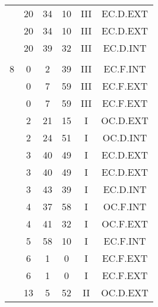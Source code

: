 \documentclass[12pt, a4paper]{article}
\begin{document}
\begin{multicols}{3}
{\begin{tabular}{c c c c c c}
	 	 	 	 & 20 & 34 & 10 & III & EC.D.EXT\\%
	 	 	 	 & 20 & 34 & 10 & III & EC.D.EXT\\%
	 	 	 	 & 20 & 39 & 32 & III & EC.D.INT\\%
	 	 	 	 & & & & & \\%
	 	 	 	8 & 0 & 2 & 39 & III & EC.F.INT\\%
	 	 	 	 & 0 & 7 & 59 & III & EC.F.EXT\\%
	 	 	 	 & 0 & 7 & 59 & III & EC.F.EXT\\%
	 	 	 	 & 2 & 21 & 15 & I & OC.D.EXT\\%
	 	 	 	 & 2 & 24 & 51 & I & OC.D.INT\\%
	 	 	 	 & 3 & 40 & 49 & I & EC.D.EXT\\%
	 	 	 	 & 3 & 40 & 49 & I & EC.D.EXT\\%
	 	 	 	 & 3 & 43 & 39 & I & EC.D.INT\\%
	 	 	 	 & 4 & 37 & 58 & I & OC.F.INT\\%
	 	 	 	 & 4 & 41 & 32 & I & OC.F.EXT\\%
	 	 	 	 & 5 & 58 & 10 & I & EC.F.INT\\%
	 	 	 	 & 6 & 1 & 0 & I & EC.F.EXT\\%
	 	 	 	 & 6 & 1 & 0 & I & EC.F.EXT\\%
	 	 	 	 & 13 & 5 & 52 & II & OC.D.EXT\\%
	 	 \end{tabular}
 	}
\end{multicols}
\end{document}
